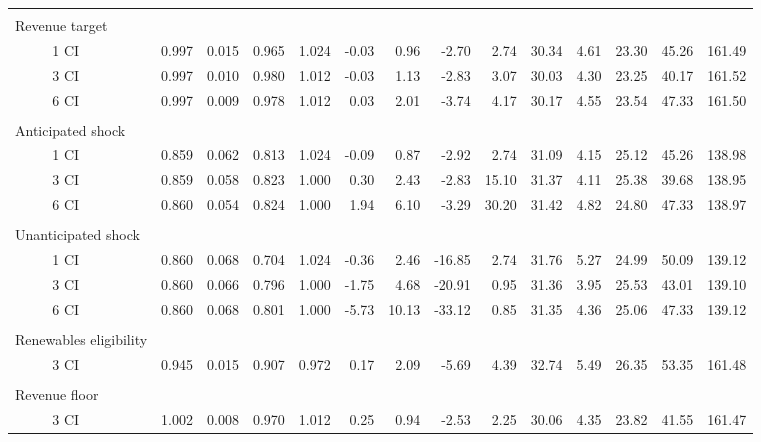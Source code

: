 \begin{tabular}{ll*{13}{r}}
&&&&&&&&&&&&&& \\ \multicolumn{2}{l}{Revenue target} &&&&&&&&&&&&&\\ & 1 CI &                    0.997 &  0.015 &  0.965 &  1.024 &                   -0.03 &   0.96 &   -2.70 &   2.74 &          30.34 &  4.61 &  23.30 &  45.26 &                 161.49 \\
              & 3 CI &                    0.997 &  0.010 &  0.980 &  1.012 &                   -0.03 &   1.13 &   -2.83 &   3.07 &          30.03 &  4.30 &  23.25 &  40.17 &                 161.52 \\
              & 6 CI &                    0.997 &  0.009 &  0.978 &  1.012 &                    0.03 &   2.01 &   -3.74 &   4.17 &          30.17 &  4.55 &  23.54 &  47.33 &                 161.50 \\
&&&&&&&&&&&&&& \\ \multicolumn{2}{l}{Anticipated shock} &&&&&&&&&&&&&\\& 1 CI &                    0.859 &  0.062 &  0.813 &  1.024 &                   -0.09 &   0.87 &   -2.92 &   2.74 &          31.09 &  4.15 &  25.12 &  45.26 &                 138.98 \\
              & 3 CI &                    0.859 &  0.058 &  0.823 &  1.000 &                    0.30 &   2.43 &   -2.83 &  15.10 &          31.37 &  4.11 &  25.38 &  39.68 &                 138.95 \\
              & 6 CI &                    0.860 &  0.054 &  0.824 &  1.000 &                    1.94 &   6.10 &   -3.29 &  30.20 &          31.42 &  4.82 &  24.80 &  47.33 &                 138.97 \\
&&&&&&&&&&&&&& \\ \multicolumn{2}{l}{Unanticipated shock} &&&&&&&&&&&&&\\ & 1 CI &                    0.860 &  0.068 &  0.704 &  1.024 &                   -0.36 &   2.46 &  -16.85 &   2.74 &          31.76 &  5.27 &  24.99 &  50.09 &                 139.12 \\
              & 3 CI &                    0.860 &  0.066 &  0.796 &  1.000 &                   -1.75 &   4.68 &  -20.91 &   0.95 &          31.36 &  3.95 &  25.53 &  43.01 &                 139.10 \\
              & 6 CI &                    0.860 &  0.068 &  0.801 &  1.000 &                   -5.73 &  10.13 &  -33.12 &   0.85 &          31.35 &  4.36 &  25.06 &  47.33 &                 139.12 \\
&&&&&&&&&&&&&& \\ \multicolumn{2}{l}{Renewables eligibility} &&&&&&&&&&&&&\\& 3 CI &                    0.945 &  0.015 &  0.907 &  0.972 &                    0.17 &   2.09 &   -5.69 &   4.39 &          32.74 &  5.49 &  26.35 &  53.35 &                 161.48 \\
&&&&&&&&&&&&&& \\ \multicolumn{2}{l}{Revenue floor} &&&&&&&&&&&&&\\& 3 CI &                    1.002 &  0.008 &  0.970 &  1.012 &                    0.25 &   0.94 &   -2.53 &   2.25 &          30.06 &  4.35 &  23.82 &  41.55 &                 161.47 \\
\bottomrule
\end{tabular}
